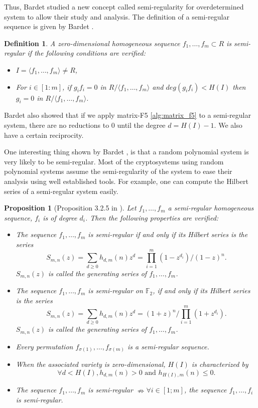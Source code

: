 \documentclass[english]{article}
\newtheorem{proposition}{Proposition}[section]
\newtheorem{definition}{Definition}[section]
\begin{document}
		Thus, Bardet studied a new concept called semi-regularity for overdetermined system to allow their study and analysis. The definition of a semi-regular sequence is given by Bardet \cite{Bardet04}.
		
		\begin{definition}
			A zero-dimensional homogeneous sequence $f_1,\dots,f_m \subset R$ is semi-regular if the following conditions are verified:
			\begin{itemize}
				\item $I = \langle f_1,\dots,f_m \rangle \neq R$,
				\item For $i \in [1:m]$, if $g_if_i = 0$ in $R/\langle f_1,\dots,f_m \rangle$ and $deg(g_if_i) < H(I)$ then $g_i = 0$ in $R/\langle f_1,\dots,f_m \rangle$.
			\end{itemize} 
		\end{definition}
		
		Bardet also showed that if we apply matrix-F5 \ref{alg:matrix_f5} to a semi-regular system, there are no reductions to 0 until the degree $d = H(I) - 1$. We also have a certain reciprocity.
		
		One interesting thing shown by Bardet \cite{Bardet04}, is that a random polynomial system is very likely to be semi-regular. Most of the cryptosystems using random polynomial systems assume the semi-regularity of the system to ease their analysis using well established tools. For example, one can compute the Hilbert series of a semi-regular system easily.
		
		\begin{proposition}[Proposition 3.2.5 in \cite{Bardet04}]\label{PropSemi}
			Let $f_1,\dots,f_m$ a semi-regular homogeneous sequence, $f_i$ is of degree $d_i$. Then the following properties are verified:
			\begin{itemize}
				\item The sequence $f_1,\dots,f_m$ is semi-regular if and only if its Hilbert series is the series $$S_{m, n}(z) = \sum_{d \geq 0}h_{d, m}(n)z^d = \prod_{i=1}^{m}(1-z^{d_i})/(1-z)^n.$$ $S_{m, n}(z)$ is called the generating series of $f_1,\dots,f_m$.
				\item The sequence $f_1,\dots,f_m$ is semi-regular on $\mathbb{F}_2$, if and only if its Hilbert series is the series $$S_{m, n}(z) = \sum_{d \geq 0}h_{d, m}(n)z^d = (1+z)^n/\prod_{i=1}^{m}(1+z^{d_i}).$$ $S_{m, n}(z)$ is called the generating series of $f_1,\dots,f_m$.
				\item Every permutation $f_{\sigma(1)},\dots,f_{\sigma(m)}$ is a semi-regular sequence.
				\item When the associated variety is zero-dimensional, $H(I)$ is characterized by
				$$
				\forall d < H(I), h_{d, m}(n) > 0 \text{ and } h_{H(I), m}(n) \leq 0.
				$$
				\item The sequence $f_1,\dots,f_m$ is semi-regular $\nRightarrow \forall i \in [1;m]$, the sequence $f_1,\dots,f_i$ is semi-regular. 
			\end{itemize}
		\end{proposition}
		
\end{document}
